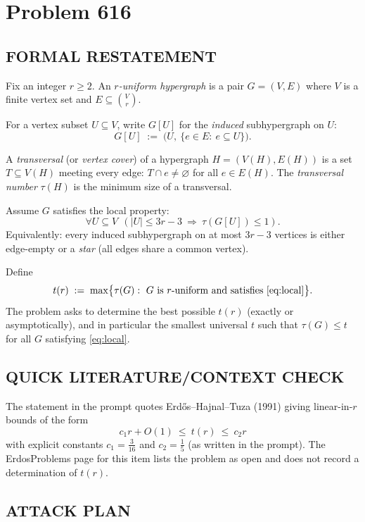 \section*{Problem 616}

\subsection*{FORMAL RESTATEMENT}

Fix an integer $r\ge 2$. An \emph{$r$-uniform hypergraph} is a pair $G=(V,E)$ where $V$ is a finite vertex set and $E\subseteq \binom{V}{r}$.

For a vertex subset $U\subseteq V$, write $G[U]$ for the \emph{induced} subhypergraph on $U$:
\[
G[U] \;:=\; \bigl(U,\ \{e\in E:\ e\subseteq U\}\bigr).
\]

A \emph{transversal} (or \emph{vertex cover}) of a hypergraph $H=(V(H),E(H))$ is a set $T\subseteq V(H)$ meeting every edge: $T\cap e\neq\varnothing$ for all $e\in E(H)$. The \emph{transversal number} $\tau(H)$ is the minimum size of a transversal.

Assume $G$ satisfies the local property:
\begin{equation}
\label{eq:local}
\forall U\subseteq V\ \ (|U|\le 3r-3\ \Rightarrow\ \tau(G[U])\le 1).
\end{equation}
Equivalently: every induced subhypergraph on at most $3r-3$ vertices is either edge-empty or a \emph{star} (all edges share a common vertex).

Define
\[
 t(r)\;:=\; \max\bigl\{\tau(G):\ G\ \text{is $r$-uniform and satisfies \eqref{eq:local}}\bigr\}.
\]
The problem asks to determine the best possible $t(r)$ (exactly or asymptotically), and in particular the smallest universal $t$ such that $\tau(G)\le t$ for all $G$ satisfying \eqref{eq:local}.

\subsection*{QUICK LITERATURE/CONTEXT CHECK}

The statement in the prompt quotes Erd\H{o}s--Hajnal--Tuza (1991) giving linear-in-$r$ bounds of the form
\[
 c_1 r + O(1)\ \le\ t(r)\ \le\ c_2 r
\]
with explicit constants $c_1=\tfrac{3}{16}$ and $c_2=\tfrac{1}{5}$ (as written in the prompt).
The ErdosProblems page for this item lists the problem as open and does not record a determination of $t(r)$.

\subsection*{ATTACK PLAN}

